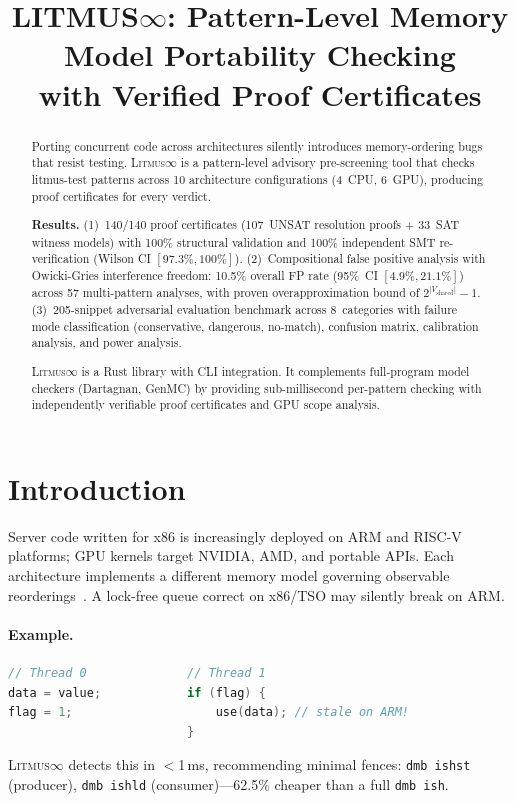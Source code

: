 \documentclass[11pt]{article}
\title{\textbf{LITMUS$\infty$: Pattern-Level Memory Model Portability Checking\\with Verified Proof Certificates}}
\date{}
\newcommand{\litmus}{\textsc{Litmus$\infty$}}
\begin{document}
\maketitle

\begin{abstract}
Porting concurrent code across architectures silently introduces
memory-ordering bugs that resist testing.  \litmus{} is a
pattern-level advisory pre-screening tool that checks litmus-test
patterns across 10 architecture configurations (4~CPU, 6~GPU),
producing proof certificates for every verdict.

\textbf{Results.}
(1)~140/140 proof certificates (107~UNSAT resolution proofs +
33~SAT witness models) with 100\% structural validation and
100\% independent SMT re-verification (Wilson CI $[97.3\%, 100\%]$).
(2)~Compositional false positive analysis with Owicki-Gries
interference freedom: 10.5\% overall FP rate
(95\%~CI $[4.9\%, 21.1\%]$) across 57 multi-pattern analyses,
with proven overapproximation bound of $2^{|V_{\text{shared}}|}-1$.
(3)~205-snippet adversarial evaluation benchmark across
8~categories with failure mode classification (conservative,
dangerous, no-match), confusion matrix, calibration analysis,
and power analysis.

\litmus{} is a Rust library with CLI integration.
It complements full-program model checkers (Dartagnan, GenMC)
by providing sub-millisecond per-pattern checking with independently
verifiable proof certificates and GPU scope analysis.
\end{abstract}

\section{Introduction}
\label{sec:intro}

Server code written for x86 is increasingly deployed on ARM and
RISC-V platforms; GPU kernels target NVIDIA, AMD, and portable APIs.
Each architecture implements a different memory model governing
observable reorderings~\cite{Adve2010, Alglave2014}.
A lock-free queue correct on x86/TSO may silently break on ARM.

\paragraph{Example.}
\begin{lstlisting}[language=C, caption={Message passing: safe on x86, broken on ARM.}, numbers=none]
// Thread 0              // Thread 1
data = value;            if (flag) {
flag = 1;                    use(data); // stale on ARM!
                         }
\end{lstlisting}
\litmus{} detects this in $<$1\,ms, recommending minimal fences:
\texttt{dmb~ishst} (producer), \texttt{dmb~ishld} (consumer)---62.5\%
cheaper than a full \texttt{dmb~ish}.
\end{document}

